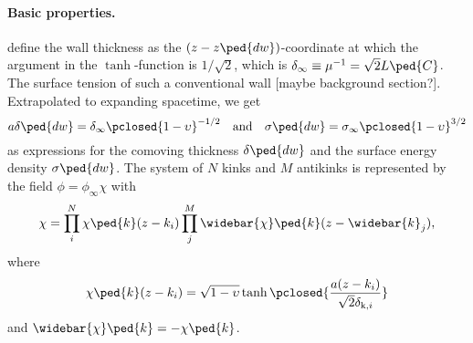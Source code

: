 
    \paragraph{Basic properties.} %
    \citet{vilenkinCosmicStringsOther1994} define the wall thickness as the $(z-z\ped{dw})$-coordinate at which the argument in the $\tanh$-function is $1/\sqrt{2}$, which is $\delta_\infty  \equiv \mu^{-1}= \sqrt{2}L\ped{C}$. The surface tension of such a conventional wall [maybe background section?]. Extrapolated to expanding spacetime, we get
    \begin{equation}
        a\delta\ped{dw} = \delta_\infty \pclosed{1-\upsilon}^{-1/2} \quad \text{and} \quad \sigma\ped{dw} = \sigma_\infty \pclosed{1-\upsilon}^{3/2}
    \end{equation}
    as expressions for the comoving thickness $\delta\ped{dw}$ and the surface energy density $\sigma\ped{dw}$. 
    The system of $N$ kinks and $M$ antikinks is represented by the field $\phi = \phi_\infty \chi$ with
    \begin{equation}
        \chi = \prod_{i}^{N} \chi\ped{k}(z-k_i) \prod_{j}^{M} \widebar{\chi}\ped{k}(z-\widebar{k}_j),
    \end{equation}
    where
    \begin{equation}
        \chi\ped{k}(z-k_i) = \sqrt{1-\upsilon} \tanh{\pclosed{ \frac{a(z-k_i)}{\sqrt{2}\delta_{\mathrm{k},i}} }}
    \end{equation}
    and $\widebar{\chi}\ped{k} = - \chi\ped{k}$. 




